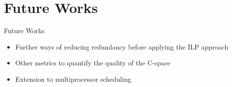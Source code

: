 \documentclass{beamer}
\begin{document}
\section{Future Works}

    \begin{frame}{Future Works}

    \begin{itemize}
        \item Further ways of reducing redundancy before applying the ILP approach
        \item Other metrics to quantify the quality of the C-space
        \item Extension to multiprocessor scheduling
    \end{itemize}

    \end{frame}



\end{document}
